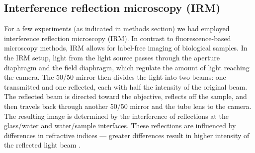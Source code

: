 \subsection{Interference reflection microscopy (IRM)}
For a few experiments (as indicated in methods section) we had employed interference reflection microscopy (IRM). In contrast to fluorescence-based microscopy methods, IRM allows for label-free imaging of biological samples. In the IRM setup, light from the light source passes through the aperture diaphragm and the field diaphragm, which regulate the amount of light reaching the camera. The 50/50 mirror then divides the light into two beams: one transmitted and one reflected, each with half the intensity of the original beam. The reflected beam is directed toward the objective, reflects off the sample, and then travels back through another 50/50 mirror and the tube lens to the camera. The resulting image is determined by the interference of reflections at the glass/water and water/sample interfaces. These reflections are influenced by differences in refractive indices — greater differences result in higher intensity of the reflected light beam \parencite{barr2009interference}.

